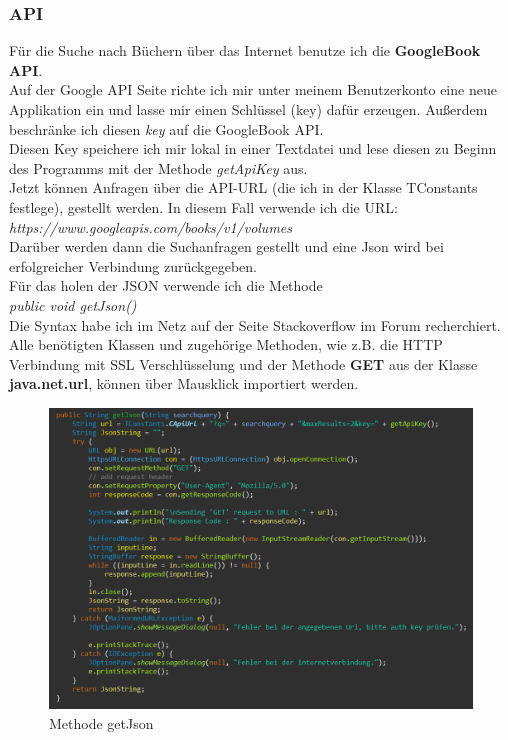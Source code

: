 \subsubsection{API}
Für die Suche nach Büchern über das Internet benutze ich die \textbf{GoogleBook API}.\\
Auf der Google API Seite richte ich mir unter meinem Benutzerkonto eine neue Applikation ein und lasse mir einen Schlüssel (key) dafür erzeugen. Außerdem beschränke ich diesen \textit{key} auf die GoogleBook API.\\
Diesen Key speichere ich mir lokal in einer Textdatei und lese diesen zu Beginn des Programms mit der Methode \textit{getApiKey} aus.\\
Jetzt können Anfragen über die API-URL (die ich in der Klasse TConstants festlege), gestellt werden. In diesem Fall verwende ich die URL:\\
\textit{https://www.googleapis.com/books/v1/volumes}\\
Darüber werden dann die Suchanfragen gestellt und eine Json wird bei erfolgreicher Verbindung zurückgegeben.\\
Für das holen der JSON verwende ich die Methode\\
\textit{public void getJson() {}}\\
\newpage
Die Syntax habe ich im Netz auf der Seite Stackoverflow im Forum recherchiert.
Alle benötigten Klassen und zugehörige Methoden, wie z.B. die HTTP Verbindung mit SSL Verschlüsselung und der Methode \textbf{GET} aus der Klasse \textbf{java.net.url}, können über Mausklick importiert werden.
\begin{figure}[h]
\begin{center}
\includegraphics[width=15cm]{img/getjson.png}
\caption{Methode getJson}
\label{getJson}
\end{center}
\end{figure}

